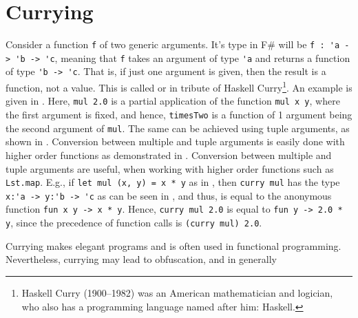 \section{Currying}
Consider a function \lstinline{f} of two generic arguments. It's type in F\# will be \lstinline{f : 'a -> 'b -> 'c}, meaning that \lstinline{f} takes an argument of type \lstinline{'a} and returns a function of type \lstinline{'b -> 'c}. That is, if just one argument is given, then the result is a function, not a value. This is called  or  in tribute of Haskell Curry\footnote{Haskell Curry (1900--1982) was an American mathematician and logician, who also has a programming language named after him: Haskell.}. An example is given in .
%
%
Here, \lstinline{mul 2.0} is a partial application of the function \lstinline{mul x y}, where the first argument is fixed, and hence, \lstinline{timesTwo} is a function of 1 argument being the second argument of \lstinline{mul}. The same can be achieved using tuple arguments, as shown in .
%
%
Conversion between multiple and tuple arguments is easily done with higher order functions as demonstrated in .
%
%
Conversion between multiple and tuple arguments are useful, when working with higher order functions such as \lstinline{Lst.map}. E.g., if \lstinline{let mul (x, y) = x * y} as in , then \lstinline{curry mul} has the type \lstinline{x:'a -> y:'b -> 'c} as can be seen in , and thus, is equal to the anonymous function \lstinline{fun x y -> x * y}. Hence, \lstinline{curry mul 2.0} is equal to \lstinline{fun y -> 2.0 * y}, since the precedence of function calls is \lstinline{(curry mul) 2.0}. 

Currying makes elegant programs and is often used in functional programming. Nevertheless, currying may lead to obfuscation, and in generally 



